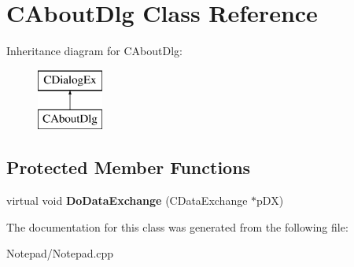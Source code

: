 \hypertarget{class_c_about_dlg}{}\section{C\+About\+Dlg Class Reference}
\label{class_c_about_dlg}
Inheritance diagram for C\+About\+Dlg\+:\begin{figure}[H]
\begin{center}
\leavevmode
\includegraphics[height=2.000000cm]{class_c_about_dlg}
\end{center}
\end{figure}
\subsection*{Protected Member Functions}
\begin{DoxyCompactItemize}
\item 
\mbox{\label{class_c_about_dlg_ab83db7484fec957282d7d5a21aed4df4}} 
virtual void {\bfseries Do\+Data\+Exchange} (C\+Data\+Exchange $\ast$p\+DX)
\end{DoxyCompactItemize}


The documentation for this class was generated from the following file\+:\begin{DoxyCompactItemize}
\item 
Notepad/Notepad.\+cpp\end{DoxyCompactItemize}
